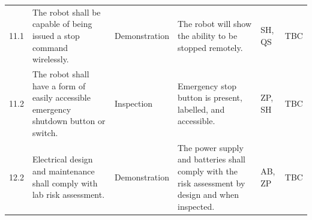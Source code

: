 \begin{landscape}
\begin{longtable}{@{}R{1.2cm} R{9.5cm} R{3.5cm} R{4.0cm} R{3.0cm} R{1.0cm}@{}}
11.1 & The robot shall be capable of being issued a stop command wirelessly. & Demonstration & The robot will show the ability to be stopped remotely. & SH, QS & TBC \\[4pt]

11.2 & The robot shall have a form of easily accessible emergency shutdown button or switch. & Inspection & Emergency stop button is present, labelled, and accessible. & ZP, SH & TBC \\[4pt]

12.2 & Electrical design and maintenance shall comply with lab risk assessment. & Demonstration & The power supply and batteries shall comply with the risk assessment by design and when inspected. & AB, ZP & TBC \\

\end{longtable}




\end{landscape}
